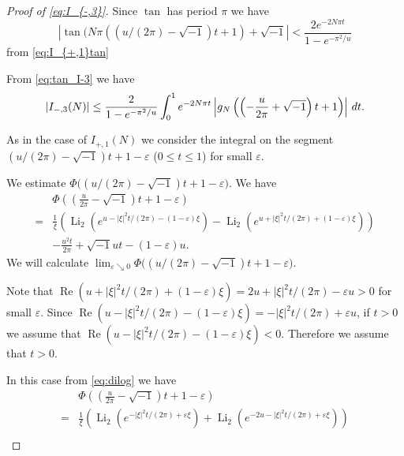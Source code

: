 \documentclass[a4paper]{amsart}
\theoremstyle{plain}
\theoremstyle{definition}
\theoremstyle{remark}
\newcommand{\Li}{\operatorname{Li}}
\renewcommand{\Re}{\operatorname{Re}}
\numberwithin{equation}{section}
\begin{document}
\begin{proof}[Proof of \eqref{eq:I_{-,3}}]
Since $\tan$ has period $\pi$ we have
\begin{equation}\label{eq:tan_I-3}
  |\tan(N\pi((u/(2\pi)-\sqrt{-1})t+1)+\sqrt{-1}|
  <
  \frac{2e^{-2N\pi t}}{1-e^{-\pi^2/u}}
\end{equation}
from \eqref{eq:I_{+,1}tan}
\par
From \eqref{eq:tan_I-3} we have
\begin{equation}\label{eq:I_{-,3}integral}
  \left|I_{-,3}(N)\right|
  \le
  \frac{2}{1-e^{-\pi^2/u}}
  \int_{0}^{1}
  e^{-2N\pi t}
  \left|
    g_N\left(\left(-\frac{u}{2\pi}+\sqrt{-1}\right)t+1\right)
  \right|
  \,dt.
\end{equation}
\par
As in the case of $I_{+,1}(N)$ we consider the integral on the segment $(u/(2\pi)-\sqrt{-1})t+1-\varepsilon$ ($0\le t\le1$) for small $\varepsilon$.
\par
We estimate $\Phi\bigl((u/(2\pi)-\sqrt{-1})t+1-\varepsilon\bigr)$.
We have
\begin{equation*}
\begin{split}
  &\Phi\left(\left(\frac{u}{2\pi}-\sqrt{-1}\right)t+1-\varepsilon\right)
  \\
  =&
  \frac{1}{\xi}
  \left(
    \Li_2(e^{u-|\xi|^2t/(2\pi)-(1-\varepsilon)\xi})
    -
    \Li_2(e^{u+|\xi|^2t/(2\pi)+(1-\varepsilon)\xi})
  \right)
  \\
  &-\frac{u^2t}{2\pi}+\sqrt{-1}ut-(1-\varepsilon)u.
\end{split}
\end{equation*}
We will calculate $\lim_{\varepsilon\searrow0}\Phi\bigl((u/(2\pi)-\sqrt{-1})t+1-\varepsilon\bigr)$.
\par
Note that $\Re(u+|\xi|^2t/(2\pi)+(1-\varepsilon)\xi)=2u+|\xi|^2t/(2\pi)-\varepsilon u>0$ for small $\varepsilon$.
Since $\Re(u-|\xi|^2t/(2\pi)-(1-\varepsilon)\xi)=-|\xi|^2t/(2\pi)+\varepsilon u$, if $t>0$ we assume that $\Re(u-|\xi|^2t/(2\pi)-(1-\varepsilon)\xi)<0$.
Therefore we assume that $t>0$.
\par
In this case from \eqref{eq:dilog} we have
\begin{equation*}
\begin{split}
  &\Phi\left(\left(\frac{u}{2\pi}-\sqrt{-1}\right)t+1-\varepsilon\right)
  \\
  =&
  \frac{1}{\xi}
  \left(
    \Li_2(e^{-|\xi|^2t/(2\pi)+\varepsilon\xi})
    +
    \Li_2(e^{-2u-|\xi|^2t/(2\pi)+\varepsilon\xi})
  \right)
  \\

\end{split}
\end{equation*}
\end{proof}
\end{document}
